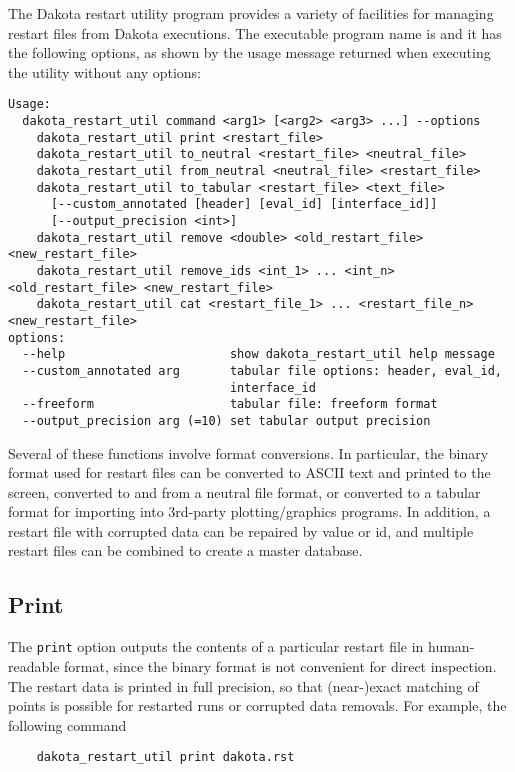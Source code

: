 The Dakota restart utility program provides a variety of facilities
for managing restart files from Dakota executions. The executable
program name is  and it has the
following options, as shown by the usage message returned when
executing the utility without any options:
\begin{footnotesize}
\begin{verbatim}
Usage:
  dakota_restart_util command <arg1> [<arg2> <arg3> ...] --options
    dakota_restart_util print <restart_file>
    dakota_restart_util to_neutral <restart_file> <neutral_file>
    dakota_restart_util from_neutral <neutral_file> <restart_file>
    dakota_restart_util to_tabular <restart_file> <text_file>
      [--custom_annotated [header] [eval_id] [interface_id]]
      [--output_precision <int>]
    dakota_restart_util remove <double> <old_restart_file> <new_restart_file>
    dakota_restart_util remove_ids <int_1> ... <int_n> <old_restart_file> <new_restart_file>
    dakota_restart_util cat <restart_file_1> ... <restart_file_n> <new_restart_file>
options:
  --help                       show dakota_restart_util help message
  --custom_annotated arg       tabular file options: header, eval_id, 
                               interface_id
  --freeform                   tabular file: freeform format
  --output_precision arg (=10) set tabular output precision
\end{verbatim}
\end{footnotesize}

Several of these functions involve format conversions. In particular,
the binary format used for restart files can be converted to ASCII
text and printed to the screen, converted to and from a neutral file
format, or converted to a tabular format for importing into 3rd-party
plotting/graphics programs. In addition, a restart file with corrupted
data can be repaired by value or id, and multiple restart files can be
combined to create a master database.

\subsection{Print}\label{restart:utility:print}

The \texttt{print} option outputs the contents of a particular restart
file in human-readable format, since the binary format is not
convenient for direct inspection. The restart data is printed in full
precision, so that (near-)exact matching of points is possible for
restarted runs or corrupted data removals. For example, the following
command
\begin{small}
\begin{verbatim}
    dakota_restart_util print dakota.rst
\end{verbatim}
\end{small}

